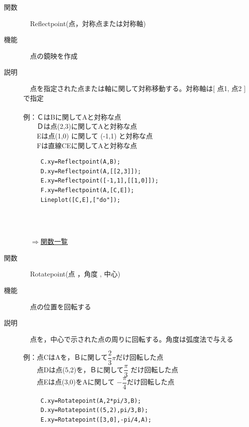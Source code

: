 \documentclass[papersize,a4paper,12pt,uplatex]{jsarticle}
\begin{document}
\begin{description}
\hypertarget{reflextpoint}{}
\item[関数]　Reflectpoint(点，対称点または対称軸)
\item[機能]　点の鏡映を作成
\item[説明]　点を指定された点または軸に関して対称移動する。対称軸は[ 点1, 点2 ]で指定\\
　\\
例：ＣはBに関してAと対称な点\\
　　Ｄは点(2,3)に関してAと対称な点\\
　　Eは点(1,0) に関して (-1,1) と対称な点\\
　　Fは直線CEに関してAと対称な点\\
\begin{verbatim}
　　　C.xy=Reflectpoint(A,B);
　　　D.xy=Reflectpoint(A,[[2,3]]);
　　　E.xy=Reflectpoint([-1,1],[[1,0]]);
　　　F.xy=Reflectpoint(A,[C,E]);
　　　Lineplot([C,E],["do"]);
\end{verbatim}
　\\
　　　　　\\
\begin{flushright}　\hyperlink{functionlist}{$\Rightarrow$関数一覧}\end{flushright}

\hypertarget{rotatepoint}{}
\item[関数]　Rotatepoint(点 ，角度 , 中心)
\item[機能]　点の位置を回転する
\item[説明]　点を，中心で示された点の周りに回転する。角度は弧度法で与える\\
\begin{spacing}{1.5}
例：点CはAを，Ｂに関して$\dfrac{2}{3}\pi $だけ回転した点\\
　　点Dは点(5,2)を，Ｂに関して$\dfrac{\pi}{3}$ だけ回転した点\\
　　点Eは点(3,0)をAに関して $-\dfrac{\pi}{4} $だけ回転した点
\end{spacing}
\begin{verbatim}
　　　C.xy=Rotatepoint(A,2*pi/3,B);
　　　D.xy=Rotatepoint((5,2),pi/3,B);
　　　E.xy=Rotatepoint([3,0],-pi/4,A);
\end{verbatim}
　\\
　　　\\
　\\


\end{description}
\end{document}
